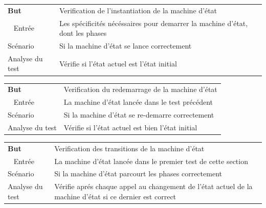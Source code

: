 \begin{center}
    \centering
    \begin{tabular}[h]{|m{4cm}|m{12cm}|} 
        \hline
        \rowcolor[HTML]{F8B400}
        \textbf{But} & Verification de l'instantiation de la machine d'état \\\
        \hline
        \hline
        \rowcolor[HTML]{F7F7F7}
        Entrée & Les spécificités nécéssaires pour demarrer la machine d'état, dont les phases \\
        \hline
        \rowcolor[HTML]{F7F7F7}
        Scénario & Si la machine d'état se lance correctement\\
        \hline
        \rowcolor[HTML]{F7F7F7}
        Analyse du test & Vérifie si l'état actuel est l'état initial \\
        \hline
    \end{tabular}
\end{center}

\begin{center}
    \centering
    \begin{tabular}[h]{|m{4cm}|m{12cm}|} 
        \hline
        \rowcolor[HTML]{F8B400}
        \textbf{But} & Verification du redemarrage de la machine d'état \\\
        \hline
        \hline
        \rowcolor[HTML]{F7F7F7}
        Entrée & La machine d'état lancée dans le test précédent \\
        \hline
        \rowcolor[HTML]{F7F7F7}
        Scénario & Si la machine d'état se re-demarre correctement\\
        \hline
        \rowcolor[HTML]{F7F7F7}
        Analyse du test & Vérifie si l'état actuel est bien l'état initial \\
        \hline
    \end{tabular}
\end{center}

\begin{center}
    \centering
    \begin{tabular}[h]{|m{4cm}|m{12cm}|} 
        \hline
        \rowcolor[HTML]{F8B400}
        \textbf{But} & Verification des transitions de la machine d'état \\\
        \hline
        \hline
        \rowcolor[HTML]{F7F7F7}
        Entrée & La machine d'état lancée dans le premier test de cette section  \\
        \hline
        \rowcolor[HTML]{F7F7F7}
        Scénario & Si la machine d'état parcourt les phases correctement\\
        \hline
        \rowcolor[HTML]{F7F7F7}
        Analyse du test & Vérifie aprés chaque appel au changement de l'état actuel de la machine d'état si ce dernier est correct \\
        \hline
    \end{tabular}
\end{center}

